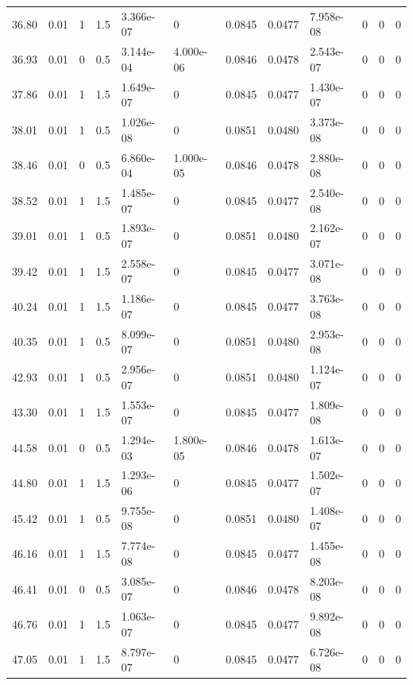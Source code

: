 \documentclass[preview]{standalone}
\begin{document}
{{{\begin{tabular}{L{1.2cm}C{1.2cm} C{0.3cm}C{0.5cm} C{1.4cm}C{1.4cm} C{1.4cm}C{1.4cm} C{1.6cm}C{1.6cm} C{1.6cm}C{1.6cm}}
  36.80  &  0.01  & 1     & 1.5 &  3.366e-07  & 0  &  0.0845&   0.0477& 7.958e-08 & 0   &  0 & 0  \\ 
  36.93  &  0.01  & 0     & 0.5 &  3.144e-04  & 4.000e-06  &  0.0846&   0.0478& 2.543e-07 & 0   &  0 & 0  \\ 
  37.86  &  0.01  & 1     & 1.5 &  1.649e-07  & 0  &  0.0845&   0.0477& 1.430e-07 & 0   &  0 & 0  \\ 
  38.01  &  0.01  & 1     & 0.5 &  1.026e-08  & 0  &  0.0851&   0.0480& 3.373e-08 & 0   &  0 & 0  \\ 
  38.46  &  0.01  & 0     & 0.5 &  6.860e-04  & 1.000e-05  &  0.0846&   0.0478& 2.880e-08 & 0   &  0 & 0  \\ 
  38.52  &  0.01  & 1     & 1.5 &  1.485e-07  & 0  &  0.0845&   0.0477& 2.540e-08 & 0   &  0 & 0  \\ 
  39.01  &  0.01  & 1     & 0.5 &  1.893e-07  & 0  &  0.0851&   0.0480& 2.162e-07 & 0   &  0 & 0  \\ 
  39.42  &  0.01  & 1     & 1.5 &  2.558e-07  & 0  &  0.0845&   0.0477& 3.071e-08 & 0   &  0 & 0  \\ 
  40.24  &  0.01  & 1     & 1.5 &  1.186e-07  & 0  &  0.0845&   0.0477& 3.763e-08 & 0   &  0 & 0  \\ 
  40.35  &  0.01  & 1     & 0.5 &  8.099e-07  & 0  &  0.0851&   0.0480& 2.953e-08 & 0   &  0 & 0  \\ 
  42.93  &  0.01  & 1     & 0.5 &  2.956e-07  & 0  &  0.0851&   0.0480& 1.124e-07 & 0   &  0 & 0  \\ 
  43.30  &  0.01  & 1     & 1.5 &  1.553e-07  & 0  &  0.0845&   0.0477& 1.809e-08 & 0   &  0 & 0  \\ 
  44.58  &  0.01  & 0     & 0.5 &  1.294e-03  & 1.800e-05  &  0.0846&   0.0478& 1.613e-07 & 0   &  0 & 0  \\ 
  44.80  &  0.01  & 1     & 1.5 &  1.293e-06  & 0  &  0.0845&   0.0477& 1.502e-07 & 0   &  0 & 0  \\ 
  45.42  &  0.01  & 1     & 0.5 &  9.755e-08  & 0  &  0.0851&   0.0480& 1.408e-07 & 0   &  0 & 0  \\ 
  46.16  &  0.01  & 1     & 1.5 &  7.774e-08  & 0  &  0.0845&   0.0477& 1.455e-08 & 0   &  0 & 0  \\ 
  46.41  &  0.01  & 0     & 0.5 &  3.085e-07  & 0  &  0.0846&   0.0478& 8.203e-08 & 0   &  0 & 0  \\ 
  46.76  &  0.01  & 1     & 1.5 &  1.063e-07  & 0  &  0.0845&   0.0477& 9.892e-08 & 0   &  0 & 0  \\ 
  47.05  &  0.01  & 1     & 1.5 &  8.797e-07  & 0  &  0.0845&   0.0477& 6.726e-08 & 0   &  0 & 0  \\ 

\end{tabular}}}}
\end{document}
